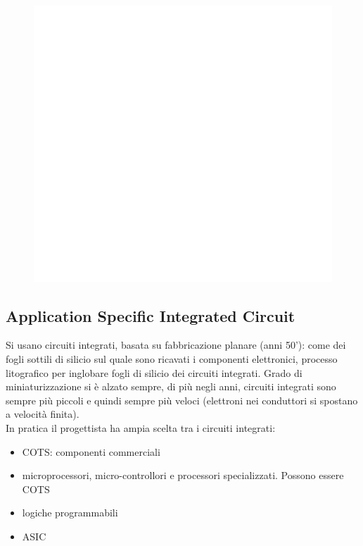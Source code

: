 \documentclass[12pt, oneside]{extbook}
\begin{document}
\begin{figure}[!h]
\centering
\includegraphics[scale=0.4]{immagini/image-046.jpg}
\end{figure}
\subsection{Application Specific Integrated Circuit}
Si usano circuiti integrati, basata su fabbricazione planare (anni 50'): come dei fogli sottili di silicio sul quale sono ricavati i componenti elettronici, processo litografico per inglobare fogli di silicio dei circuiti integrati. Grado di miniaturizzazione si è alzato sempre, di più negli anni, circuiti integrati sono sempre più piccoli e quindi sempre più veloci (elettroni nei conduttori si spostano a velocità finita).\\ In pratica il progettista ha ampia scelta tra i circuiti integrati:
\begin{itemize}
\item COTS: componenti commerciali
\item microprocessori, micro-controllori e processori specializzati. Possono essere COTS
\item logiche programmabili
\item ASIC
\end{itemize}
\end{document}
